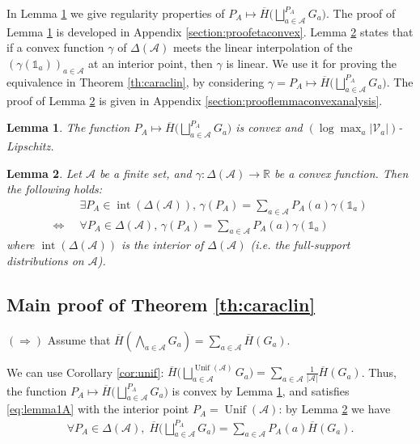 \documentclass[conference,a4paper]{IEEEtran}
\DeclareMathOperator*{\Unif}{Unif}
\DeclareMathOperator*{\interior}{int}
\newtheorem{lemma}{Lemma}
\begin{document}
In Lemma \ref{th:etaconvex} we give regularity properties of $P_A \mapsto \overline{H}\big(\bigsqcup_{a \in \mathcal{A}}^{P_A} G_a\big)$. The proof of Lemma \ref{th:etaconvex} is developed in Appendix \ref{section:proofetaconvex}. Lemma \ref{lemma:convexanalysis} states that if a convex function $\gamma$ of $\Delta(\mathcal{A})$ meets the linear interpolation of the $(\gamma(\mathds{1}_a))_{a \in \mathcal{A}}$ at an interior point, then $\gamma$ is linear. We use it for proving the equivalence in Theorem \ref{th:caraclin}, by considering $\gamma = P_A \mapsto \overline{H}\big(\bigsqcup_{a \in \mathcal{A}}^{P_A} G_a\big)$. The proof of Lemma \ref{lemma:convexanalysis} is given in Appendix \ref{section:prooflemmaconvexanalysis}.

\begin{lemma}\label{th:etaconvex}
    The function $P_A \mapsto \overline{H}\big(\bigsqcup_{a \in \mathcal{A}}^{P_A} G_a\big)$ is convex and $(\log \max_a |\mathcal{V}_a|)$-Lipschitz.
\end{lemma}

\begin{lemma}\label{lemma:convexanalysis}
    Let $\mathcal{A}$ be a finite set, and $\gamma : \Delta(\mathcal{A}) \rightarrow \mathbb{R}$ be a convex function. Then the following holds:
    \begin{align}
        & \exists P_A \in \interior(\Delta(\mathcal{A})), \, \gamma(P_A) = \textstyle\sum_{a \in \mathcal{A}} P_A(a) \gamma(\mathds{1}_a) \label{eq:lemma1A}\\
        \Longleftrightarrow \;\; & \forall P_A \in \Delta(\mathcal{A}), \, \gamma(P_A) = \textstyle\sum_{a \in \mathcal{A}} P_A(a) \gamma(\mathds{1}_a) \label{eq:lemma1B}
    \end{align}
    where $\interior(\Delta(\mathcal{A}))$ is the interior of $\Delta(\mathcal{A})$ (i.e. the full-support distributions on $\mathcal{A}$).
\end{lemma}

\subsection{Main proof of Theorem \ref{th:caraclin}}

$(\Longrightarrow)$ Assume that $\overline{H}\left(\textstyle\bigwedge_{a \in \mathcal{A}} G_{a}\right) = \textstyle\sum_{a \in \mathcal{A}} \overline{H}(G_{a})$.

We can use Corollary \ref{cor:unif}: $\overline{H}\big(\bigsqcup_{a \in \mathcal{A}}^{\Unif(\mathcal{A})} G_a\big) = \sum_{a \in \mathcal{A}} \frac{1}{|\mathcal{A}|}\overline{H}(G_{a})$. Thus, the function $P_A \mapsto \overline{H}\big(\bigsqcup_{a \in \mathcal{A}}^{P_A} G_a\big)$ is convex by Lemma \ref{th:etaconvex}, and satisfies \eqref{eq:lemma1A} with the interior point $P_A = \Unif(\mathcal{A})$: by Lemma \ref{lemma:convexanalysis} we have
\begin{align}
    \forall P_A \in \Delta(\mathcal{A}),\; \overline{H}\big(\textstyle\bigsqcup_{a \in \mathcal{A}}^{P_A} G_a\big) = \textstyle\sum_{a \in \mathcal{A}} P_A(a) \overline{H}(G_a).\label{eq:proofcormainB}
\end{align}
\end{document}
